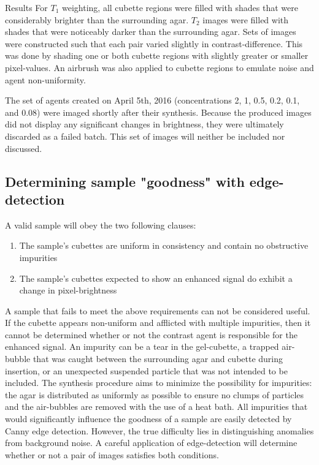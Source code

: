\documentclass[a4paper,12pt]{article}
\begin{document}
\begin{section}{Results}
For $T_1$ weighting, all cubette regions were filled with shades that were considerably brighter than the surrounding agar. $T_2$ images were filled with shades that were noticeably darker than the surrounding agar. Sets of images were constructed such that each pair varied slightly in contrast-difference. This was done by shading one or both cubette regions with slightly greater or smaller pixel-values. An airbrush was also applied to cubette regions to emulate noise and agent non-uniformity.

The set of agents created on April 5th, 2016 (concentrations 2, 1, 0.5, 0.2, 0.1, and 0.08) were imaged shortly after their synthesis. Because the produced images did not display any significant changes in brightness, they were ultimately discarded as a failed batch. This set of images will neither be included nor discussed. 

\subsection{Determining sample "goodness" with edge-detection}

A valid sample will obey the two following clauses: 

\singlespacing
\begin{enumerate}
\item The sample's cubettes are uniform in consistency and contain no obstructive impurities
\item The sample's cubettes expected to show an enhanced signal do exhibit a change in pixel-brightness
\end{enumerate}
\doublespacing

A sample that fails to meet the above requirements can not be considered useful. If the cubette appears non-uniform and afflicted with multiple impurities, then it cannot be determined whether or not the contrast agent is responsible for the enhanced signal. An impurity can be a tear in the gel-cubette, a trapped air-bubble that was caught between the surrounding agar and cubette during insertion, or an unexpected suspended particle that was not intended to be included. The synthesis procedure aims to minimize the possibility for impurities: the agar is distributed as uniformly as possible to ensure no clumps of particles and the air-bubbles are removed with the use of a heat bath. All impurities that would significantly influence the goodness of a sample are easily detected by Canny edge detection. However, the true difficulty lies in distinguishing anomalies from background noise. A careful application of edge-detection will determine whether or not a pair of images satisfies both conditions. 


\end{section}
\end{document}
